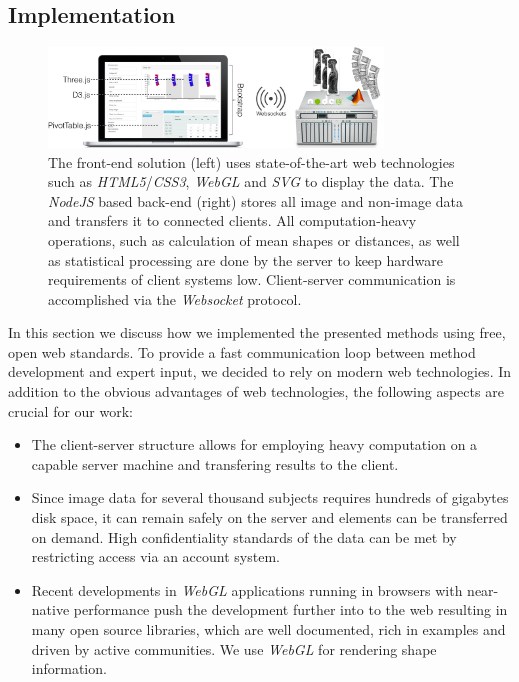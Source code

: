 \documentclass[journal]{style/vgtc} 			          %
\begin{document}
\subsection{Implementation} \label{implementation}
\begin{figure}[htb]
 \centering
 \label{fig:technologies}
 \includegraphics[width=3.5in]{figures/technologies}
 \caption{The front-end solution (left) uses state-of-the-art web technologies such as \emph{HTML5}/\emph{CSS3}, \emph{WebGL} and \emph{SVG} to display the data.
 The \emph{NodeJS} based back-end (right) stores all image and non-image data and transfers it to connected clients.
 All computation-heavy operations, such as calculation of mean shapes or distances, as well as statistical processing are done by the server to keep hardware requirements of client systems low. 
 Client-server communication is accomplished via the \emph{Websocket} protocol.
 }
\end{figure}
In this section we discuss how we implemented the presented methods using free, open web standards.
%
To provide a fast communication loop between method development and expert input, we decided to rely on modern web technologies.
%
In addition to the obvious advantages of web technologies, the following aspects are crucial for our work:
\begin{itemize}
	\item The client-server structure allows for employing heavy computation on a capable server machine and transfering results to the client.
	\item Since image data for several thousand subjects requires hundreds of gigabytes disk space, it can remain safely on the server and elements can be transferred on demand.
	High confidentiality standards of the data can be met by restricting access via an account system.
	\item Recent developments in \emph{WebGL} applications running in browsers with near-native performance push the development further into to the web resulting in many open source libraries, which are well documented, rich in examples and driven by active communities. We use \emph{WebGL} for rendering shape information.
\end{itemize}
\end{document}
